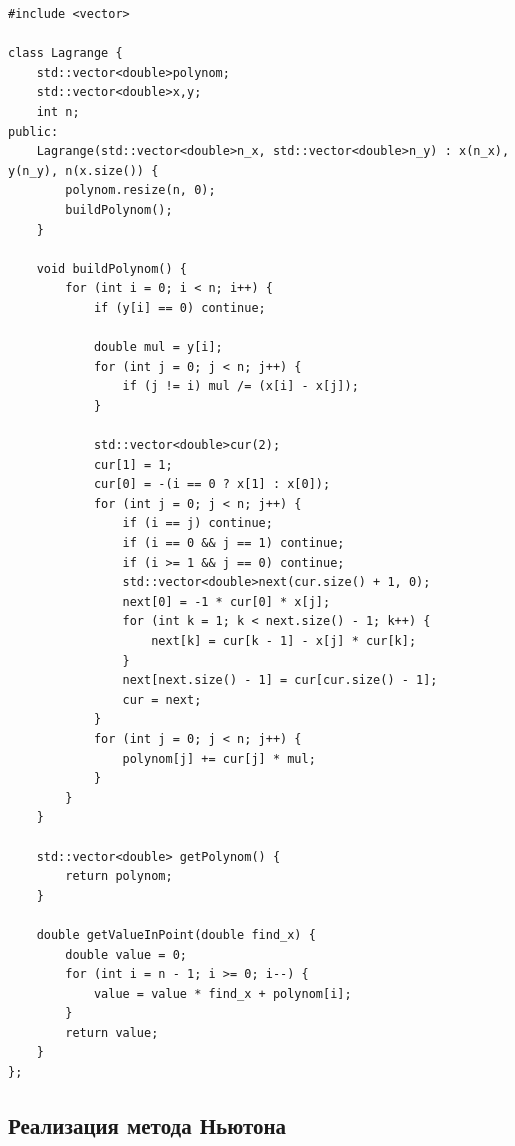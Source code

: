 \documentclass[12pt,a4paper]{article}
\begin{document}
\begin{lstlisting}
#include <vector>

class Lagrange {
    std::vector<double>polynom;
    std::vector<double>x,y;
    int n;
public:
    Lagrange(std::vector<double>n_x, std::vector<double>n_y) : x(n_x), y(n_y), n(x.size()) {
        polynom.resize(n, 0);
        buildPolynom();
    }

    void buildPolynom() {
        for (int i = 0; i < n; i++) {
            if (y[i] == 0) continue;

            double mul = y[i];
            for (int j = 0; j < n; j++) {
                if (j != i) mul /= (x[i] - x[j]);
            }

            std::vector<double>cur(2);
            cur[1] = 1;
            cur[0] = -(i == 0 ? x[1] : x[0]);
            for (int j = 0; j < n; j++) {
                if (i == j) continue;
                if (i == 0 && j == 1) continue;
                if (i >= 1 && j == 0) continue;
                std::vector<double>next(cur.size() + 1, 0);
                next[0] = -1 * cur[0] * x[j];
                for (int k = 1; k < next.size() - 1; k++) {
                    next[k] = cur[k - 1] - x[j] * cur[k];
                }
                next[next.size() - 1] = cur[cur.size() - 1];
                cur = next;
            }
            for (int j = 0; j < n; j++) {
                polynom[j] += cur[j] * mul;
            }
        }
    }

    std::vector<double> getPolynom() {
        return polynom;
    }

    double getValueInPoint(double find_x) {
        double value = 0;
        for (int i = n - 1; i >= 0; i--) {
            value = value * find_x + polynom[i];
        }
        return value;
    }
};
\end{lstlisting}

\subsection{Реализация метода Ньютона}
\end{document}
